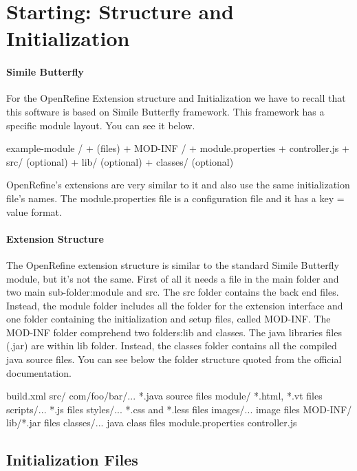\section{Starting: Structure and Initialization}
\paragraph{Simile Butterfly} For the OpenRefine Extension structure and Initialization we have to recall that this software is based on Simile Butterfly framework. This framework has a specific module layout. You can see it below.
\begin{code}
example-module /
   + (files)
   + MOD-INF /
      + module.properties
      + controller.js
      + src/ (optional)
      + lib/ (optional)
      + classes/ (optional)
\end{code}
OpenRefine's extensions are very similar to it and also use the same initialization file's names. The module.properties file is a configuration file and it has a key = value format.

\paragraph{Extension Structure}
The OpenRefine extension structure is similar to the standard Simile Butterfly module, but it's not the same. First of all it needs a  file in the main folder and two main sub-folder:\textsf{module} and \textsf{src}. The \textsf{src} folder contains the back end files. Instead, the \textsf{module} folder includes all the folder for the extension interface and one folder containing the initialization and setup files, called \textsf{MOD-INF}. The \textsf{MOD-INF} folder comprehend two folders:\textsf{lib} and \textsf{classes}. The java libraries files (.jar) are within \textsf{lib} folder. Instead, the \textsf{classes} folder contains all the compiled java source files. You can see below the folder structure quoted from the official documentation.

\begin{code}
  build.xml
  src/
      com/foo/bar/... *.java source files
  module/
      *.html, *.vt files
      scripts/... *.js files
      styles/... *.css and *.less files
      images/... image files
      MOD-INF/
          lib/*.jar files
          classes/... java class files
          module.properties
          controller.js
\end{code}

\subsection{Initialization Files}
